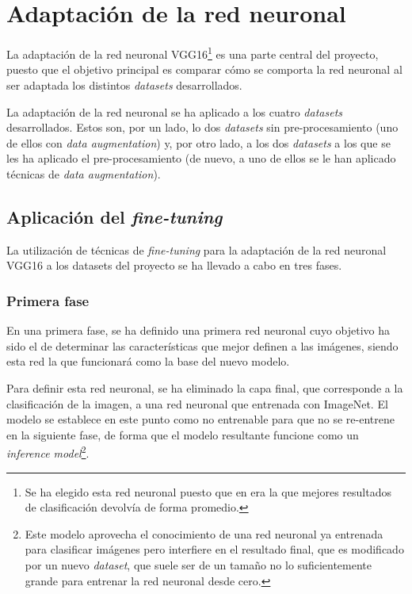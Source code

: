 \section{Adaptación de la red neuronal}

La adaptación de la red neuronal VGG16\footnote{Se ha elegido esta red neuronal puesto que en \cite{tfg_iris_2020} era la que mejores resultados de clasificación devolvía de forma promedio.} es una parte central del proyecto, puesto que el objetivo principal es comparar cómo se comporta la red neuronal al ser adaptada los distintos \textit{datasets} desarrollados.

La adaptación de la red neuronal se ha aplicado a los cuatro \textit{datasets} desarrollados. Estos son, por un lado, lo dos \textit{datasets} sin pre-procesamiento (uno de ellos con \textit{data augmentation}) y, por otro lado, a los dos \textit{datasets} a los que se les ha aplicado el pre-procesamiento (de nuevo, a uno de ellos se le han aplicado técnicas de \textit{data augmentation}). 
\subsection{Aplicación del \textit{fine-tuning}}

La utilización de técnicas de \textit{fine-tuning} para la adaptación de la red neuronal VGG16 a los datasets del proyecto se ha llevado a cabo en tres fases. 

\subsubsection{Primera fase}
En una primera fase, se ha definido una primera red neuronal cuyo objetivo ha sido el de determinar las características que mejor definen a las imágenes, siendo esta red la que funcionará como la base del nuevo modelo. 

Para definir esta red neuronal, se ha eliminado la capa final, que corresponde a la clasificación de la imagen, a una red neuronal que entrenada con ImageNet. El modelo se establece en este punto como no entrenable para que no se re-entrene en la siguiente fase, de forma que el modelo resultante funcione como un \textit{inference model}\footnote{Este modelo aprovecha el conocimiento de una red neuronal ya entrenada para clasificar imágenes pero interfiere en el resultado final, que es modificado por un nuevo \textit{dataset}, que suele ser de un tamaño no lo suficientemente grande para entrenar la red neuronal desde cero.}. 

